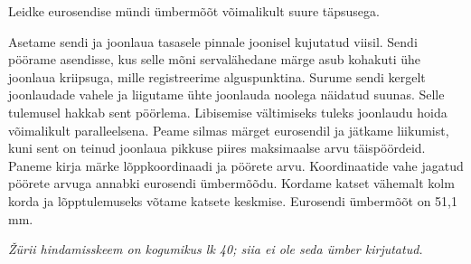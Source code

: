 
Leidke eurosendise mündi ümbermõõt võimalikult suure täpsusega.

\hint

\solu
Asetame sendi ja joonlaua tasasele pinnale joonisel kujutatud viisil. Sendi pöörame asendisse, kus selle mõni servalähedane märge asub kohakuti ühe joonlaua kriipsuga, mille registreerime alguspunktina. Surume sendi kergelt joonlaudade vahele ja liigutame ühte joonlauda noolega näidatud suunas. Selle tulemusel hakkab sent pöörlema. Libisemise vältimiseks tuleks joonlaudu hoida võimalikult paralleelsena. Peame silmas märget eurosendil ja jätkame liikumist, kuni sent on teinud joonlaua pikkuse piires maksimaalse arvu täispöördeid. Paneme kirja märke lõppkoordinaadi ja pöörete arvu. Koordinaatide vahe jagatud pöörete arvuga annabki eurosendi ümbermõõdu. Kordame katset vähemalt kolm korda ja lõpptulemuseks võtame katsete keskmise. Eurosendi ümbermõõt on 51,1 mm.

\textit{Žürii hindamisskeem on kogumikus lk 40; siia ei ole seda ümber kirjutatud.}
\probend

